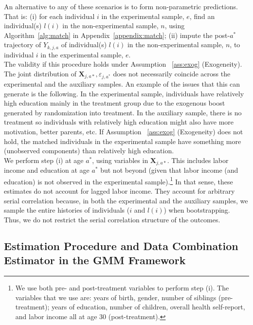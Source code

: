 \noindent An alternative to any of these scenarios is to form non-parametric predictions. That is: (i) for each individual $i$ in the experimental sample, $e$, find an individual(s) $l(i)$ in the non-experimental sample, $n$, using Algorithm~\ref{alg:match} in Appendix~\ref{appendix:match}; (ii) impute the post-$a^*$ trajectory of $Y_{k,j,a}$ of individual(s) $l(i)$ in the non-experimental sample, $n$, to individual $i$ in the experimental sample, $e$.\\ 

\noindent The validity if this procedure holds under Assumption ~\ref{ass:exog} (Exogeneity). The joint distribution of $\bm{X}_{j,a*}, \varepsilon_{j,a^*}$ does not necessarily coincide across the experimental and the auxiliary samples. An example of the issues that this can generate is the following. In the experimental sample, individuals have relatively high education mainly in the treatment group due to the exogenous boost generated by randomization into treatment. In the auxiliary sample, there is no treatment so individuals with relatively high education might also have more motivation, better parents, etc. If Assumption ~\ref{ass:exog} (Exogeneity) does not hold, the matched individuals in the experimental sample have something more (unobserved components) than relatively high education.\\

\noindent We perform step (i) at age $a^*$, using variables in $\bm{X}_{j,a*}$. This includes labor income and education at age $a^*$ but not beyond (given that labor income (and education) is not observed in the experimental sample).\footnote{We use both pre- and post-treatment variables to perform step (i). The variables that we use are: years of birth, gender, number of siblings (pre-treatment); years of education, number of children, overall health self-report, and labor income all at age 30 (post-treatment).} In that sense, these estimates do not account for lagged labor income. They account for arbitrary serial correlation because, in both the experimental and the auxiliary samples, we sample the entire histories of individuals ($i$ and $l(i)$) when bootstrapping. Thus, we do not restrict the serial correlation structure of the outcomes.\\


\subsection{Estimation Procedure and Data Combination Estimator in the GMM Framework} \label{appendix:gmm}

